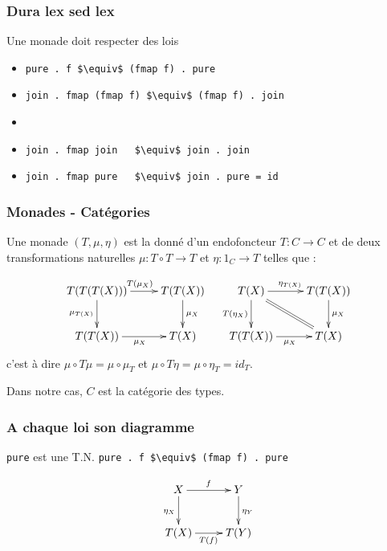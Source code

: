\documentclass{beamer}
\begin{document}
\begin{frame}
\frametitle{Dura lex sed lex}
\begin{alertblock}{Une monade doit respecter des lois}
\begin{itemize}
\item \verb!pure . f $\equiv$ (fmap f) . pure!
\item \verb!join . fmap (fmap f) $\equiv$ (fmap f) . join!
\item[] \ 
\item \verb!join . fmap join   $\equiv$ join . join!
\item \verb!join . fmap pure   $\equiv$ join . pure = id!
\end{itemize}
\end{alertblock}
\end{frame}

\begin{frame}
\frametitle{Monades - Catégories}
Une monade $(T, \mu, \eta)$ est la donné d'un
endofoncteur $T : C \rightarrow C$ et de deux
transformations naturelles $\mu : T\circ T \rightarrow T$ et $\eta : 1_C \rightarrow T$ telles que :

\[
\begin{array}{cc}
\xymatrix{
T(T(T(X))) \ar[r]^{T(\mu_X)} \ar[d]_{\mu_{T(X)}} & T(T(X)) \ar[d]^{\mu_X} \\
T(T(X)) \ar[r]_{\mu_X} & T(X) \\
}
&
\xymatrix{
T(X) \ar[r]^{\eta_{T(X)}} \ar[d]_{T(\eta_X)}  \ar@{=}[dr] & T(T(X)) \ar[d]^{\mu_X} \\
T(T(X)) \ar[r]_{\mu_X} & T(X) \\
}
\end{array}
\]
c'est à dire
$\mu \circ T\mu = \mu \circ \mu_T$
et
$\mu \circ T \eta = \mu \circ \eta_T = id_T$.

\pause

Dans notre cas, $C$ est la catégorie des types.
\end{frame}

\begin{frame}
\frametitle{A chaque loi son diagramme}
\begin{alertblock}{\verb!pure! est une T.N.}
\verb!pure . f $\equiv$ (fmap f) . pure!
\end{alertblock}

\begin{block}{}
\[
\xymatrix{
X \ar[r]^{f} \ar[d]_{\eta_X} & Y \ar[d]^{\eta_Y} \\
T(X) \ar[r]_{T(f)} & T(Y) \\
}
\]
\end{block}

\end{frame}
\end{document}
